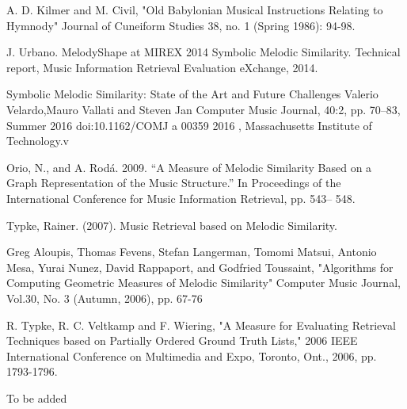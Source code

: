 \documentclass{llncs}
\begin{document}
	\begin{thebibliography}{7}
	
	A. D. Kilmer and M. Civil, 
	"Old Babylonian Musical Instructions Relating to Hymnody" 
	Journal of Cuneiform Studies 38, 
	no. 1 (Spring 1986): 94-98.

	J. Urbano. MelodyShape at 
	MIREX 2014 Symbolic Melodic Similarity. 
	Technical report, Music Information Retrieval Evaluation eXchange, 2014.

	Symbolic Melodic Similarity: State of the Art and Future Challenges
	Valerio Velardo,Mauro Vallati and Steven Jan
	Computer Music Journal, 40:2, pp. 70–83, Summer 2016 doi:10.1162/COMJ a 00359
	2016 , Massachusetts Institute of Technology.v

	 Orio, N., and A. Rodá. 2009. “A Measure of Melodic Similarity Based on a Graph Representation of the Music Structure.” In Proceedings of the International Conference for Music Information Retrieval, pp. 543– 548.

	 Typke, Rainer. (2007). Music Retrieval based on Melodic Similarity.

	 Greg Aloupis, Thomas Fevens, Stefan Langerman, Tomomi Matsui, Antonio Mesa, Yurai Nunez, David Rappaport, and Godfried Toussaint, "Algorithms for Computing Geometric Measures of Melodic Similarity" Computer Music Journal, Vol.30, No. 3 (Autumn, 2006), pp. 67-76

	 R. Typke, R. C. Veltkamp and F. Wiering, "A Measure for Evaluating Retrieval Techniques based on Partially Ordered Ground Truth Lists," 2006 IEEE International Conference on Multimedia and Expo, Toronto, Ont., 2006, pp. 1793-1796.
	
	 To be added

	\end{thebibliography}

	
\end{document}
